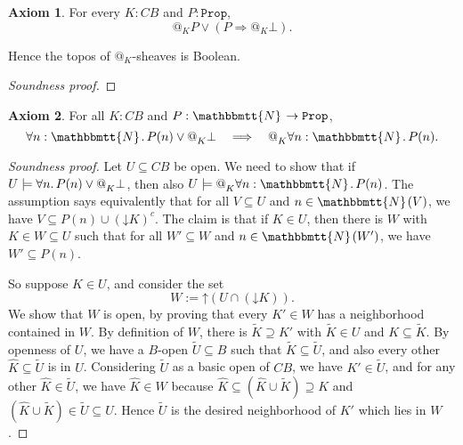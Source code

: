\documentclass[11pt, oneside, article]{memoir}
\makeatletter
\newcommand{\tob}[1]{\todo[color=blue!40,inline]{\textbf{T:} #1}}
\theoremstyle{plain}
\theoremstyle{definition}
\newtheorem{axiom}{Axiom}
\theoremstyle{remark}
\newenvironment{soundproof}{\begin{proof}[Soundness proof]}{\end{proof}}
\renewcommand{\ss}{\subseteq}
\newcommand{\const}[1]{\mathtt{#1}}
\newcommand{\wt}[1]{\widetilde{#1}}
\newcommand{\wh}[1]{\widehat{#1}}
\newcommand{\internal}[1]{\raisebox{-.03ex}{$\mathbbmtt{#1}$}}
\newcommand{\hs}{\hspace{1.1pt}}
\newcommand{\tNN}{\internal{N}\hs}
\newcommand{\Prop}{\const{Prop}}
\newcommand{\BaseSpace}{B}
\newcommand{\CB}{C\BaseSpace}
\newcommand{\AtSymbol}{{@}}
\newcommand{\At}[2][]{\AtSymbol^{#1}_{#2}}
\newcommand{\down}{\mathord{\downarrow}}
\newcommand{\up}{\mathord{\uparrow}}
\newcommand{\imp}{\Rightarrow}
\makeatother
\begin{document}
\begin{axiom}\label{ax.atBoolean}
	For every $K : \CB$ and $P : \Prop$,
\[
	\At{K} P \lor ( P \imp \At{K} \bot).
\]
\end{axiom}

Hence the topos of $\At{K}$-sheaves is Boolean.

\begin{soundproof}
	\tob{tbw}
\end{soundproof}

\begin{axiom}
	\label{ax.N_vs_at}
	For all $K:\CB$ and $P : \tNN \to \Prop$,
	\[
		\forall n : \tNN \ldotp P(n) \lor \At{K} \bot \quad \Longrightarrow \quad \At{K} \forall n : \tNN \ldotp P(n).
	\]
\end{axiom}

\begin{soundproof}
	Let $U\ss\CB$ be open. We need to show that if $U \models \forall n\ldotp P(n) \lor \At{K} \bot$, then also $U \models \At{K} \forall n : \tNN \ldotp P(n)$. The assumption says equivalently that for all $V\subseteq U$ and $n\in \tNN(V)$, we have $V \subseteq P(n) \cup (\down K)^c$. The claim is that if $K\in U$, then there is $W$ with $K\in W \subseteq U$ such that for all $W'\subseteq W$ and $n\in\tNN(W')$, we have $W' \ss P(n)$.

	So suppose $K\in U$, and consider the set
	\[
		W := \up (U \cap (\down K)).
	\]
		We show that $W$ is open, by proving that every $K'\in W$ has a neighborhood contained in $W$. By definition of $W$, there is $\wt{K} \supseteq K'$ with $\wt{K} \in U$ and $K \subseteq \wt{K}$. By openness of $U$, we have a $B$-open $\wt{U} \subseteq B$ such that $\wt{K} \subseteq \wt{U}$, and also every other $\wh{K} \subseteq \wt{U}$ is in $U$. Considering $\wt{U}$ as a basic open of $\CB$, we have $K'\in\wt{U}$, and for any other $\wh{K}\in\wt{U}$, we have $\wh{K}\in W$ because $\wh{K}\ss(\wh{K}\cup\wt{K})\supseteq K$ and $(\wh{K}\cup\wt{K})\in\wt{U}\ss U$. Hence $\wt{U}$ is the desired neighborhood of $K'$ which lies in $W$.



\end{soundproof}
\end{document}
